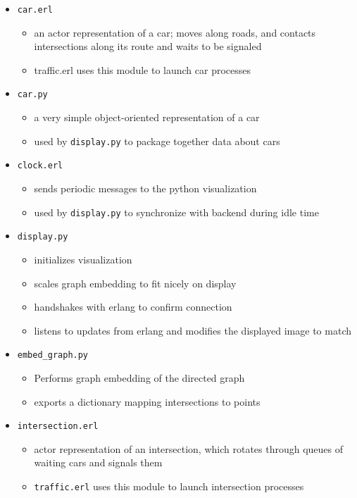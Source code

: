 \documentclass{article}
\newcommand{\ttt}[1]{\texttt{#1}}
\begin{document}
\begin{itemize}

	\item \ttt{car.erl}
	\begin{itemize}
		\item an actor representation of a car; moves along roads, and contacts intersections along its route and waits to be signaled
		\item traffic.erl uses this module to launch car processes
	\end{itemize}
	\item \ttt{car.py}
	\begin{itemize}
		\item a very simple object-oriented representation of a car
		\item used by \ttt{display.py} to package together data about cars
	\end{itemize}
	\item \ttt{clock.erl}
	\begin{itemize}
		\item sends periodic messages to the python visualization
		\item used by \ttt{display.py} to synchronize with backend during idle time
	\end{itemize}
	\item \ttt{display.py}
	\begin{itemize}
		\item initializes visualization
		\item scales graph embedding to fit nicely on display
		\item handshakes with erlang to confirm connection
		\item listens to updates from erlang and modifies the displayed image to match
	\end{itemize}
	\item \ttt{embed\_graph.py}
	\begin{itemize}
		\item Performs graph embedding of the directed graph 
		\item exports a dictionary mapping intersections to points
	\end{itemize}
	\item \ttt{intersection.erl}
	\begin{itemize}
		\item actor representation of an intersection, which rotates through queues of waiting cars and signals them
		\item \ttt{traffic.erl} uses this module to launch intersection processes

\end{itemize}
\end{itemize}
\end{document}
